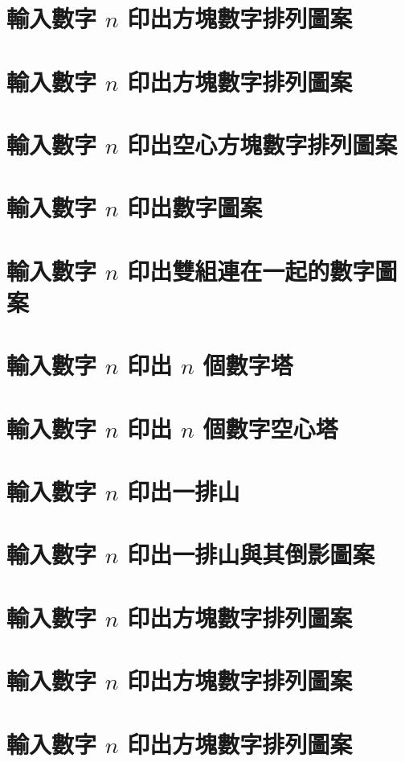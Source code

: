 \section{輸入數字 $n$ 印出方塊數字排列圖案}


\section{輸入數字 $n$ 印出方塊數字排列圖案}


\section{輸入數字 $n$ 印出空心方塊數字排列圖案}


\section{輸入數字 $n$ 印出數字圖案}


\section{輸入數字 $n$ 印出雙組連在一起的數字圖案}


\section{輸入數字 $n$ 印出 $n$ 個數字塔}


\section{輸入數字 $n$ 印出 $n$ 個數字空心塔}


\section{輸入數字 $n$ 印出一排山}


\section{輸入數字 $n$ 印出一排山與其倒影圖案}


\section{輸入數字 $n$ 印出方塊數字排列圖案}


\section{輸入數字 $n$ 印出方塊數字排列圖案}


\section{輸入數字 $n$ 印出方塊數字排列圖案}

